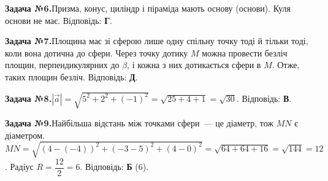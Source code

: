 \documentclass[12pt]{article}
\begin{document}
\par\vspace{0.3cm}\noindent\hypertarget{sol:6}{}
\begin{tcolorbox}[colback=titleBg!40, colframe=mainGreen!55, boxrule=0.4pt, arc=2pt, left=6pt, right=6pt, top=4pt, bottom=4pt, breakable]
\noindent\small\textbf{Задача №6.}\quad Призма, конус, циліндр і піраміда мають основу (основи). Куля основи не має. Відповідь: \textbf{Г}.
\par\vspace{0.1cm}\hfill\hyperlink{task:6}{}
\end{tcolorbox}
\par\vspace{0.3cm}\noindent\hypertarget{sol:7}{}
\begin{tcolorbox}[colback=titleBg!40, colframe=mainGreen!55, boxrule=0.4pt, arc=2pt, left=6pt, right=6pt, top=4pt, bottom=4pt, breakable]
\noindent\small\textbf{Задача №7.}\quad Площина має зі сферою лише одну спільну точку тоді й тільки тоді, коли вона дотична до сфери. Через точку дотику $M$ можна провести безліч площин, перпендикулярних до $\beta$, і кожна з них дотикається сфери в $M$. Отже, таких площин безліч. Відповідь: \textbf{Д}.
\par\vspace{0.1cm}\hfill\hyperlink{task:7}{}
\end{tcolorbox}
\par\vspace{0.3cm}\noindent\hypertarget{sol:8}{}
\begin{tcolorbox}[colback=titleBg!40, colframe=mainGreen!55, boxrule=0.4pt, arc=2pt, left=6pt, right=6pt, top=4pt, bottom=4pt, breakable]
\noindent\small\textbf{Задача №8.}\quad $|\vec{a}|=\sqrt{5^2+2^2+(-1)^2}=\sqrt{25+4+1}=\sqrt{30}$. Відповідь: \textbf{В}.
\par\vspace{0.1cm}\hfill\hyperlink{task:8}{}
\end{tcolorbox}
\par\vspace{0.3cm}\noindent\hypertarget{sol:9}{}
\begin{tcolorbox}[colback=titleBg!40, colframe=mainGreen!55, boxrule=0.4pt, arc=2pt, left=6pt, right=6pt, top=4pt, bottom=4pt, breakable]
\noindent\small\textbf{Задача №9.}\quad Найбільша відстань між точками сфери~--- це діаметр, тож $MN$ є діаметром. $MN=\sqrt{(4-(-4))^2+(-3-5)^2+(4-0)^2}=\sqrt{64+64+16}=\sqrt{144}=12$. Радіус $R=\dfrac{12}{2}=6$. Відповідь: \textbf{Б} ($6$).
\par\vspace{0.1cm}\hfill\hyperlink{task:9}{}
\end{tcolorbox}
\end{document}
